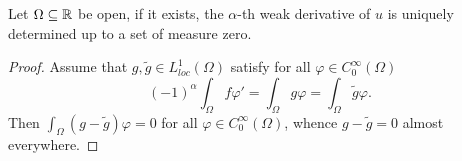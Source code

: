 \begin{atheorem} \label{athem:uniqueness_of_weak_deriv}
	Let $\Omega \subseteq \mathbb{R}$ be open, if it exists, the $\alpha$-th weak derivative of $u$ is uniquely determined up to a set of measure zero.
	
	\begin{proof}
		Assume that $g, \tilde{g} \in L_{loc}^{1}(\Omega)$ satisfy for all $\varphi \in C_{0}^{\infty}(\Omega)$
		\[ (-1)^{\alpha} \int_{\Omega} f \varphi' = \int_{\Omega} g \varphi  = \int_{\Omega} \tilde{g} \varphi. \]
		Then $\int_{\Omega} \left( g - \tilde{g} \right) \varphi = 0$ for all $\varphi \in C_{0}^{\infty}(\Omega)$, whence $g - \tilde{g} = 0$ almost everywhere.	
	\end{proof}
\end{atheorem}  